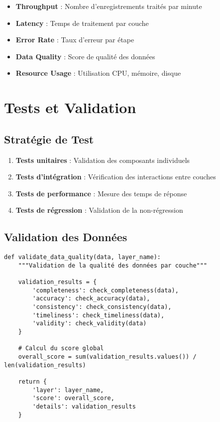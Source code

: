 \begin{itemize}
    \item \textbf{Throughput} : Nombre d'enregistrements traités par minute
    \item \textbf{Latency} : Temps de traitement par couche
    \item \textbf{Error Rate} : Taux d'erreur par étape
    \item \textbf{Data Quality} : Score de qualité des données
    \item \textbf{Resource Usage} : Utilisation CPU, mémoire, disque
\end{itemize}

\section{Tests et Validation}

\subsection{Stratégie de Test}

\begin{enumerate}
    \item \textbf{Tests unitaires} : Validation des composants individuels
    \item \textbf{Tests d'intégration} : Vérification des interactions entre couches
    \item \textbf{Tests de performance} : Mesure des temps de réponse
    \item \textbf{Tests de régression} : Validation de la non-régression
\end{enumerate}

\subsection{Validation des Données}

\begin{verbatim}
def validate_data_quality(data, layer_name):
    """Validation de la qualité des données par couche"""
    
    validation_results = {
        'completeness': check_completeness(data),
        'accuracy': check_accuracy(data),
        'consistency': check_consistency(data),
        'timeliness': check_timeliness(data),
        'validity': check_validity(data)
    }
    
    # Calcul du score global
    overall_score = sum(validation_results.values()) / len(validation_results)
    
    return {
        'layer': layer_name,
        'score': overall_score,
        'details': validation_results
    }
\end{verbatim}

